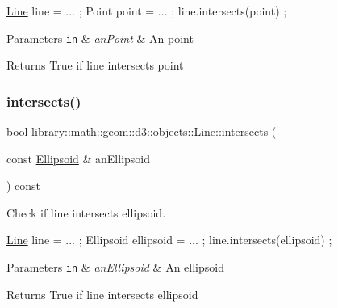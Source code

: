 \begin{DoxyCode}
\hyperlink{classlibrary_1_1math_1_1geom_1_1d3_1_1objects_1_1_line_a762e529453ff9ffa9233fd73737f4692}{Line} line = ... ;
Point point = ... ;
line.intersects(point) ;
\end{DoxyCode}



\begin{DoxyParams}[1]{Parameters}
\mbox{\tt in}  & {\em an\+Point} & An point \\
\hline
\end{DoxyParams}
\begin{DoxyReturn}{Returns}
True if line intersects point 
\end{DoxyReturn}
\mbox{\label{classlibrary_1_1math_1_1geom_1_1d3_1_1objects_1_1_line_a2cc1edf1b60745c518fbf19f2ab0771c}} 
\subsubsection{\texorpdfstring{intersects()}{intersects()}\hspace{0.1cm}{\footnotesize\ttfamily [2/2]}}
{\footnotesize\ttfamily bool library\+::math\+::geom\+::d3\+::objects\+::\+Line\+::intersects (\begin{DoxyParamCaption}\item[{const \hyperlink{classlibrary_1_1math_1_1geom_1_1d3_1_1objects_1_1_ellipsoid}{Ellipsoid} \&}]{an\+Ellipsoid }\end{DoxyParamCaption}) const}



Check if line intersects ellipsoid. 


\begin{DoxyCode}
\hyperlink{classlibrary_1_1math_1_1geom_1_1d3_1_1objects_1_1_line_a762e529453ff9ffa9233fd73737f4692}{Line} line = ... ;
Ellipsoid ellipsoid = ... ;
line.intersects(ellipsoid) ;
\end{DoxyCode}



\begin{DoxyParams}[1]{Parameters}
\mbox{\tt in}  & {\em an\+Ellipsoid} & An ellipsoid \\
\hline
\end{DoxyParams}
\begin{DoxyReturn}{Returns}
True if line intersects ellipsoid 
\end{DoxyReturn}
\mbox{\label{classlibrary_1_1math_1_1geom_1_1d3_1_1objects_1_1_line_ab7b509259a32ac21c83bb14fcc7f83f3}} 
